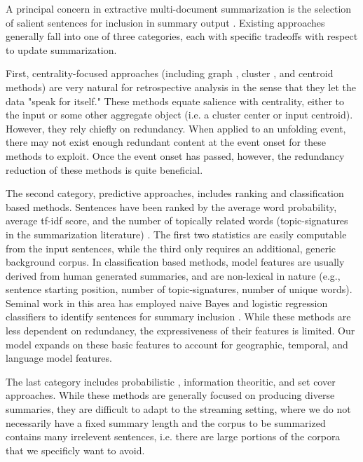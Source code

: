 \label{sec:relatedwork}

A principal concern in extractive multi-document summarization is the
selection of salient sentences for inclusion in summary output
\cite{nenkova2012survey}. 
Existing approaches generally fall into  %
one of three categories, each with specific tradeoffs with respect to update 
summarization. 

First, centrality-focused approaches (including graph \cite{erkan2004lexrank},
cluster \cite{hatzivassiloglou2001simfinder}, and centroid \cite{radev2004centroid} methods) are very natural for retrospective analysis in
the sense that they let the data "speak for itself." 
These methods equate salience with centrality, either to the input or some other
aggregate object (i.e. a cluster center or input centroid).
However, they rely
chiefly on
redundancy. When applied to an unfolding event, there may not exist enough
redundant content at the event onset for these methods to exploit.
Once the event onset has passed, however, the redundancy reduction of these 
methods is quite beneficial.

The second category, predictive approaches,
includes ranking and classification based methods.
Sentences have been ranked by the average word probability, average tf-idf
score, and the number of topically related words (topic-signatures in the
summarization literature)
\cite{nenkova2005impact,hovy1998automated,lin2000automated}. The first two
statistics are easily computable from the input sentences, while the third
only requires an additional, generic background corpus.  
In classification based methods, model features are
usually derived from human generated summaries, and are non-lexical in nature
(e.g., sentence starting position, number of topic-signatures, number of
unique words). Seminal work in this area has employed naive
Bayes and logistic regression classifiers to identify sentences for summary
inclusion \cite{kupiec1995trainable,conroy2001using}. 
While these methods are less dependent on redundancy, the expressiveness of
their features is limited. Our model expands on these basic features to 
account for geographic, temporal, and language model features.

The last category includes probabilistic \cite{haghighi2009exploring}, 
information theoritic, and set cover \cite{lin2011class}
approaches. While these methods are generally focused on producing diverse
summaries, they are difficult to adapt to the streaming setting, where 
we do not necessarily have a fixed summary length and the corpus to be
summarized contains many irrelevent sentences, i.e. there are large
portions of the corpora that we specificly want to avoid. 




